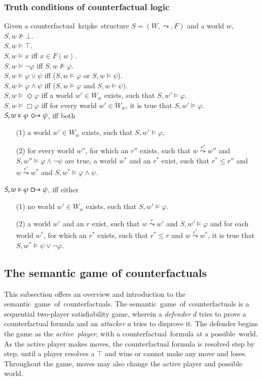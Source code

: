 \documentclass[a4paper,american]{paper}
\theoremstyle{definition}\newtheorem{definition}{Definition}
\begin{document}
\subsubsection{Truth conditions of counterfactual logic}
Given a counterfactual~kripke~structure $S = (W, \leadsto ,F)$ and a world $w$,\\
$S,w\nvDash\bot$.\\
$S,w\vDash\top$.\\
$S,w\vDash x$ iff $x\in F(w)$.\\
$S,w\vDash \neg\varphi$ iff $S,w\nvDash\varphi$.\\
$S,w\vDash \varphi\vee\psi$ iff ($S,w\vDash\varphi$ or $S,w\vDash\psi$).\\
$S,w\vDash \varphi\wedge\psi$ iff ($S,w\vDash\varphi$ and $S,w\vDash\psi$).\\
$S,w\vDash \Diamond \varphi$ iff a world $w'\in W_w$ exists, such that $S,w' \vDash \varphi$.\\
$S,w\vDash \Box \varphi$ iff for every world $w'\in W_w$, it is true that $S,w' \vDash \varphi$.\\
$S,w\vDash \varphi \Diamondright \psi$, iff both 
\begin{itemize}
	\item[(1)] a world $w'\in W_w$ exists, such that $S,w' \vDash \varphi$,
	\item[(2)] for every world $w''$, for which an $r''$ exists, such that $w\overset{r''}{\leadsto}w''$ and $S,w'' \vDash \varphi\wedge\neg\psi$ are true, a world $w^*$ and an $r^*$ exist, such that $r^* \leq r''$ and $w\overset{r^*}{\leadsto}w^*$ and $S,w^* \vDash \varphi\wedge\psi$.
\end{itemize}

\noindent$S,w \vDash \varphi \boxright \psi$, iff either
\begin{itemize}
	\item[(1)] no world $w'\in W_w$ exists, such that $S,w' \vDash \varphi$.
	\item[(2)] a world $w'$ and an $r$ exist, such that $w\overset{r}{\leadsto} w'$ and $S,w'\vDash \varphi$ and for each world $w^*$, for which an $r^*$ exists, such that $r^*\leq r$ and $w\overset{r^*}{\leadsto} w^*$, it is true that $S,w^*\vDash\psi\vee\neg\varphi$.
\end{itemize}
\subsection{The semantic game of counterfactuals}
This subsection offers an overview and introduction to the semantic~game~of~counterfactuals. The semantic~game~of~counterfactuals is a sequential two-player satisfiability game, wherein a \textit{defender} $d$ tries to prove a counterfactual formula and an \textit{attacker} $a$ tries to disprove it. The defender begins the game as the \textit{active~player}, with a counterfactual~formula at a possible~world. As the active player makes moves, the counterfactual formula is resolved step by step, until a player resolves a $\top$ and wins or cannot make any move and loses. Throughout the game, moves may also change the active player and possible world.
\end{document}
